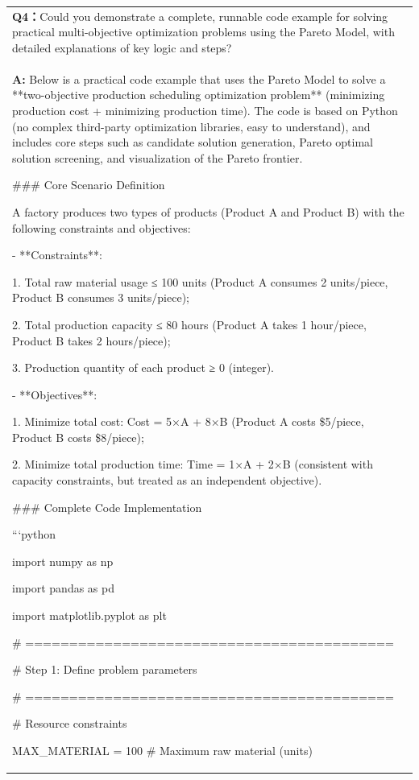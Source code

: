 \begin{longtable}[]{@{}
  >{\raggedright\arraybackslash}p{}@{}}
\toprule
\endhead
\textbf{Q4：}Could you demonstrate a complete, runnable code example for
solving practical multi-objective optimization problems using the Pareto
Model, with detailed explanations of key logic and steps? \\
\textbf{A:} Below is a practical code example that uses the Pareto Model
to solve a **two-objective production scheduling optimization problem**
(minimizing production cost + minimizing production time). The code is
based on Python (no complex third-party optimization libraries, easy to
understand), and includes core steps such as candidate solution
generation, Pareto optimal solution screening, and visualization of the
Pareto frontier.

\#\#\# Core Scenario Definition

A factory produces two types of products (Product A and Product B) with
the following constraints and objectives:

- **Constraints**:

1. Total raw material usage ≤ 100 units (Product A consumes 2
units/piece, Product B consumes 3 units/piece);

2. Total production capacity ≤ 80 hours (Product A takes 1 hour/piece,
Product B takes 2 hours/piece);

3. Production quantity of each product ≥ 0 (integer).

- **Objectives**:

1. Minimize total cost: Cost = 5×A + 8×B (Product A costs \$5/piece,
Product B costs \$8/piece);

2. Minimize total production time: Time = 1×A + 2×B (consistent with
capacity constraints, but treated as an independent objective).

\#\#\# Complete Code Implementation

```python

import numpy as np

import pandas as pd

import matplotlib.pyplot as plt

\# ==========================================

\# Step 1: Define problem parameters

\# ==========================================

\# Resource constraints

MAX\_MATERIAL = 100 \# Maximum raw material (units)


\end{longtable}

